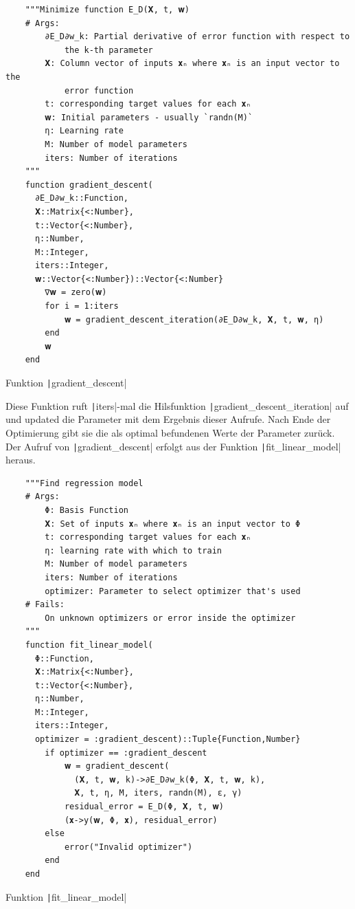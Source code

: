 \documentclass{article}
\theoremstyle{plain} %
\theoremstyle{definition} %
\begin{document}
\begin{listing}[H]
  \begin{verbatim} 
    """Minimize function E_D(𝐗, t, 𝐰)
    # Args:
        ∂E_D∂w_k: Partial derivative of error function with respect to
            the k-th parameter
        𝐗: Column vector of inputs 𝐱ₙ where 𝐱ₙ is an input vector to the
            error function
        t: corresponding target values for each 𝐱ₙ
        𝐰: Initial parameters - usually `randn(M)`
        η: Learning rate
        M: Number of model parameters
        iters: Number of iterations
    """
    function gradient_descent(
      ∂E_D∂w_k::Function,
      𝐗::Matrix{<:Number},
      t::Vector{<:Number},
      η::Number,
      M::Integer,
      iters::Integer,
      𝐰::Vector{<:Number})::Vector{<:Number}
        ∇𝐰 = zero(𝐰)
        for i = 1:iters
            𝐰 = gradient_descent_iteration(∂E_D∂w_k, 𝐗, t, 𝐰, η)
        end
        𝐰
    end
  \end{verbatim}
  \caption{Funktion \texttt|gradient_descent|}
  \label{listing:gd}
\end{listing}

Diese Funktion ruft \texttt|iters|-mal die Hilsfunktion \texttt|gradient_descent_iteration| auf und updated die Parameter mit dem Ergebnis dieser Aufrufe. Nach Ende der Optimierung gibt sie die als optimal befundenen Werte der Parameter zurück. 
\newpage
Der Aufruf von \texttt|gradient_descent| erfolgt aus der Funktion \texttt|fit_linear_model| heraus.

\begin{listing}[H]
  \begin{verbatim} 
    """Find regression model 
    # Args:
        Φ: Basis Function
        𝐗: Set of inputs 𝐱ₙ where 𝐱ₙ is an input vector to Φ
        t: corresponding target values for each 𝐱ₙ
        η: learning rate with which to train
        M: Number of model parameters
        iters: Number of iterations
        optimizer: Parameter to select optimizer that's used
    # Fails:
        On unknown optimizers or error inside the optimizer
    """
    function fit_linear_model(
      Φ::Function,
      𝐗::Matrix{<:Number},
      t::Vector{<:Number},
      η::Number,
      M::Integer,
      iters::Integer,
      optimizer = :gradient_descent)::Tuple{Function,Number}
        if optimizer == :gradient_descent
            𝐰 = gradient_descent(
              (𝐗, t, 𝐰, k)->∂E_D∂w_k(Φ, 𝐗, t, 𝐰, k),
              𝐗, t, η, M, iters, randn(M), ε, γ)
            residual_error = E_D(Φ, 𝐗, t, 𝐰)
            (𝐱->y(𝐰, Φ, 𝐱), residual_error)
        else
            error("Invalid optimizer")
        end
    end
  \end{verbatim}
  \caption{Funktion \texttt|fit_linear_model|}
  \label{listing:gd}
\end{listing}
\end{document}
